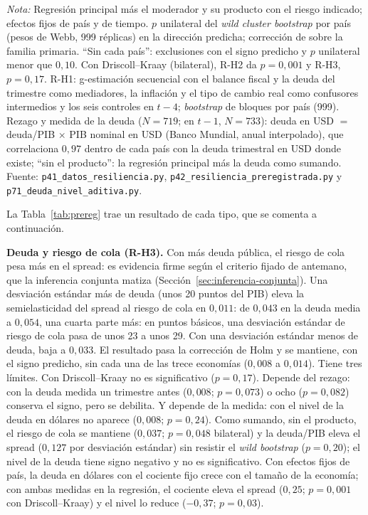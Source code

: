 \begin{table}[htbp]
\par\smallskip\parbox{0.95\linewidth}{\footnotesize \textit{Nota:} Regresión principal más el moderador y su producto con el riesgo indicado; efectos fijos de país y de tiempo. $p$ unilateral del \textit{wild cluster bootstrap} por país (pesos de Webb, 999 réplicas) en la dirección predicha; corrección de \citet{Holm1979} sobre la familia primaria. ``Sin cada país'': exclusiones con el signo predicho y $p$ unilateral menor que $0{,}10$. Con Driscoll--Kraay (bilateral), R-H2 da $p=0{,}001$ y R-H3, $p=0{,}17$. R-H1: g-estimación secuencial con el balance fiscal y la deuda del trimestre como mediadores, la inflación y el tipo de cambio real como confusores intermedios y los seis controles en $t-4$; \textit{bootstrap} de bloques por país (999). Rezago y medida de la deuda ($N=719$; en $t-1$, $N=733$): deuda en USD $=$ deuda/PIB $\times$ PIB nominal en USD (Banco Mundial, anual interpolado), que correlaciona $0{,}97$ dentro de cada país con la deuda trimestral en USD donde existe; ``sin el producto'': la regresión principal más la deuda como sumando. Fuente: \texttt{p41\_datos\_resiliencia.py}, \texttt{p42\_resiliencia\_preregistrada.py} y \texttt{p71\_deuda\_nivel\_aditiva.py}.}
\end{table}

La Tabla~\ref{tab:prereg} trae un resultado de cada tipo, que se comenta a continuación.

\textbf{Deuda y riesgo de cola (R-H3).} Con más deuda pública, el riesgo de cola pesa más en el spread: es evidencia firme según el criterio fijado de antemano, que la inferencia conjunta matiza (Sección~\ref{sec:inferencia-conjunta}). Una desviación estándar más de deuda (unos 20 puntos del PIB) eleva la semielasticidad del spread al riesgo de cola en $0{,}011$: de $0{,}043$ en la deuda media a $0{,}054$, una cuarta parte más: en puntos básicos, una desviación estándar de riesgo de cola pasa de unos 23 a unos 29. Con una desviación estándar menos de deuda, baja a $0{,}033$. El resultado pasa la corrección de Holm y se mantiene, con el signo predicho, sin cada una de las trece economías ($0{,}008$ a $0{,}014$). Tiene tres límites. Con Driscoll--Kraay no es significativo ($p=0{,}17$). Depende del rezago: con la deuda medida un trimestre antes ($0{,}008$; $p=0{,}073$) o ocho ($p=0{,}082$) conserva el signo, pero se debilita. Y depende de la medida: con el nivel de la deuda en dólares no aparece ($0{,}008$; $p=0{,}24$). Como sumando, sin el producto, el riesgo de cola se mantiene ($0{,}037$; $p=0{,}048$ bilateral) y la deuda/PIB eleva el spread ($0{,}127$ por desviación estándar) sin resistir el \textit{wild bootstrap} ($p=0{,}20$); el nivel de la deuda tiene signo negativo y no es significativo. Con efectos fijos de país, la deuda en dólares con el cociente fijo crece con el tamaño de la economía; con ambas medidas en la regresión, el cociente eleva el spread ($0{,}25$; $p=0{,}001$ con Driscoll--Kraay) y el nivel lo reduce ($-0{,}37$; $p=0{,}03$).

